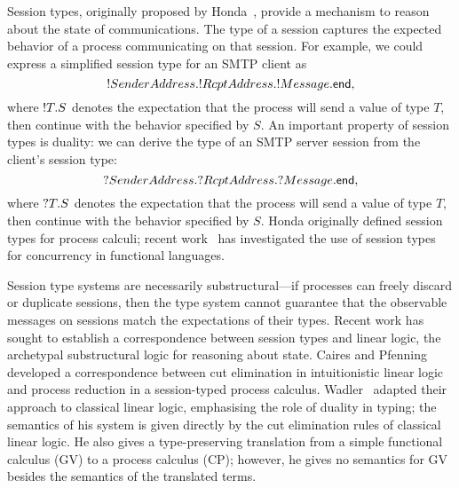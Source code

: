 \documentclass[oribibl,orivec,envcountsame]{llncs}
\begin{document}
Session types, originally proposed by Honda~\cite{Honda93}, provide a mechanism to reason about the
state of communications.  The type of a session captures the expected behavior of a process
communicating on that session.  For example, we could express a simplified session type for an SMTP
client as
\[
  {!SenderAddress.{!RcptAddress.{!Message.\mathsf{end}}}},
\]
where ${!T.S}$ denotes the expectation that the process will send a value of type $T$, then
continue with the behavior specified by $S$. An important property of session types is duality: we
can derive the type of an SMTP server session from the client's session type:
\[
  {?SenderAddress.{?RcptAddress.{?Message.\mathsf{end}}}},
\]
where ${?T.S}$ denotes the expectation that the process will send a value of type $T$, then
continue with the behavior specified by $S$.  Honda originally defined session types for process
calculi; recent work~\cite{VasconcelosGR06,GayVasconcelos10} has investigated the use of session
types for concurrency in functional languages.

Session type systems are necessarily substructural---if processes can freely discard or duplicate
sessions, then the type system cannot guarantee that the observable messages on sessions match the
expectations of their types. Recent work has sought to establish a correspondence between session
types and linear logic, the archetypal substructural logic for reasoning about state.  Caires and
Pfenning~\cite{CairesPfenning10} developed a correspondence between cut elimination in
intuitionistic linear logic and process reduction in a session-typed process
calculus. Wadler~\cite{Wadler14} adapted their approach to classical linear logic, emphasising the
role of duality in typing; the semantics of his system is given directly by the cut elimination
rules of classical linear logic. He also gives a type-preserving translation from a simple
functional calculus (GV) to a process calculus (CP); however, he gives no semantics for GV besides
the semantics of the translated terms.
\end{document}
